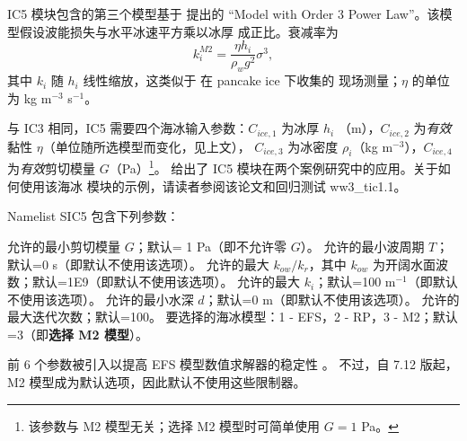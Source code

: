 {\code IC5} 模块包含的第三个模型基于 \citet[][其第 6.2 节；下文称 M2 模型]{Meylan2018}
提出的 ``Model with Order 3 Power Law''。该模型假设波能损失与水平冰速平方乘以冰厚
成正比。衰减率为
\begin{equation}
k_i^{M2} = \frac{\eta h_i}{\rho_w g^2} \sigma^3,
\label{eq:m2pw}
\end{equation}
其中 $k_i$ 随 $h_i$ 线性缩放，这类似于 \citet{art:Dob15} 在 pancake ice 下收集的
现场测量；$\eta$ 的单位为 kg m$^{-3}$ s$^{-1}$。

与 {\code IC3} 相同，{\code IC5} 需要四个海冰输入参数：$C_{ice, 1}$ 为冰厚 $h_i$
（m），$C_{ice, 2}$ 为\emph{有效}黏性 $\eta$（单位随所选模型而变化，见上文），
$C_{ice, 3}$ 为冰密度 $\rho_i$（kg m$^{-3}$），$C_{ice, 4}$ 为\emph{有效}剪切模量
$G$（Pa）\footnote{该参数与 M2 模型无关；选择 M2 模型时可简单使用 $G=1$ Pa。}。
\citet{Liu2020} 给出了 {\code IC5} 模块在两个案例研究中的应用。关于如何使用该海冰
模块的示例，请读者参阅该论文和回归测试 {\code ww3\_tic1.1}。

Namelist {\F SIC5} 包含下列参数：
\begin{clist}
 {允许的最小剪切模量 $G$；默认= 1 Pa（即不允许零 $G$）。}
%
 {允许的最小波周期 $T$；默认=0 s（即默认不使用该选项）。}
%
 {允许的最大 $k_{ow}/k_r$，其中 $k_{ow}$ 为开阔水面波数；默认=1E9（即默认不使用该选项）。}
%
 {允许的最大 $k_i$；默认=100 m$^{-1}$（即默认不使用该选项）。}
%
 {允许的最小水深 $d$；默认=0 m（即默认不使用该选项）。}
%
 {允许的最大迭代次数；默认=100。}
%
 {要选择的海冰模型：1 - {\code EFS}，2 - {\code RP}，3 - {\code M2}；默认=3（即\textbf{选择 {\code M2} 模型}）。}
\end{clist}
前 6 个参数被引入以提高 EFS 模型数值求解器的稳定性
\citep[在少数情况下，特别是水深 $d$ 较浅且 $G$ 较低时，求解器可能在短波周期下失败；见][]{Liu2020}。
不过，自 7.12 版起，M2 模型成为默认选项，因此默认不使用这些限制器。
